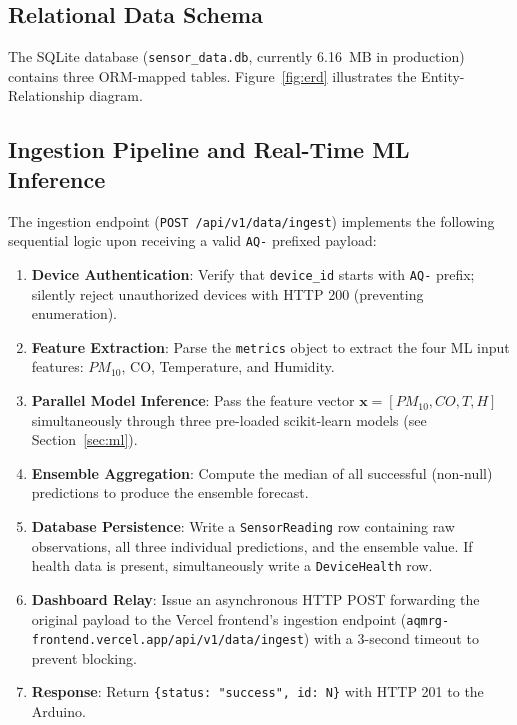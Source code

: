 \figMethodologyAppFactory

\subsection{Relational Data Schema}
The SQLite database (\texttt{sensor\_data.db}, currently 6.16~MB in production) contains three ORM-mapped tables. Figure~\ref{fig:erd} illustrates the Entity-Relationship diagram.

\figMethodologyErd

\subsection{Ingestion Pipeline and Real-Time ML Inference}
The ingestion endpoint (\texttt{POST /api/v1/data/ingest}) implements the following sequential logic upon receiving a valid \texttt{AQ-} prefixed payload:

\begin{enumerate}[nosep]
    \item \textbf{Device Authentication}: Verify that \texttt{device\_id} starts with \texttt{AQ-} prefix; silently reject unauthorized devices with HTTP 200 (preventing enumeration).
    \item \textbf{Feature Extraction}: Parse the \texttt{metrics} object to extract the four ML input features: $PM_{10}$, CO, Temperature, and Humidity.
    \item \textbf{Parallel Model Inference}: Pass the feature vector $\mathbf{x} = [PM_{10}, CO, T, H]$ simultaneously through three pre-loaded scikit-learn models (see Section~\ref{sec:ml}).
    \item \textbf{Ensemble Aggregation}: Compute the median of all successful (non-null) predictions to produce the ensemble forecast.
    \item \textbf{Database Persistence}: Write a \texttt{SensorReading} row containing raw observations, all three individual predictions, and the ensemble value. If health data is present, simultaneously write a \texttt{DeviceHealth} row.
    \item \textbf{Dashboard Relay}: Issue an asynchronous HTTP POST forwarding the original payload to the Vercel frontend's ingestion endpoint (\texttt{aqmrg-frontend.vercel.app/api/v1/data/ingest}) with a 3-second timeout to prevent blocking.
    \item \textbf{Response}: Return \texttt{\{status: "success", id: N\}} with HTTP 201 to the Arduino.
\end{enumerate}

